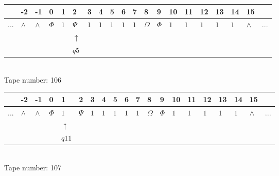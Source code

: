 \documentclass[11pt]{article}
\begin{document}
\begin{table}[H]
\centering
\begin{tabular}{llllllllllllllllllll}
 & -2 & -1 & 0 & 1 & 2 & 3 & 4 & 5 & 6 & 7 & 8 & 9 & 10 & 11 & 12 & 13 & 14 & 15 & \\
\hline
$...$ & \multicolumn{1}{|l|}{$\wedge$} & \multicolumn{1}{|l|}{$\wedge$} & \multicolumn{1}{|l|}{$\Phi$} & \multicolumn{1}{|l|}{$1$} & \multicolumn{1}{|l|}{$\Psi$} & \multicolumn{1}{|l|}{$1$} & \multicolumn{1}{|l|}{$1$} & \multicolumn{1}{|l|}{$1$} & \multicolumn{1}{|l|}{$1$} & \multicolumn{1}{|l|}{$1$} & \multicolumn{1}{|l|}{$\Omega$} & \multicolumn{1}{|l|}{$\Phi$} & \multicolumn{1}{|l|}{$1$} & \multicolumn{1}{|l|}{$1$} & \multicolumn{1}{|l|}{$1$} & \multicolumn{1}{|l|}{$1$} & \multicolumn{1}{|l|}{$1$} & \multicolumn{1}{|l|}{$\wedge$} & $...$\\
\hline
&  &  &  &  & $\uparrow$ &  &  &  &  &  &  &  &  &  &  &  &  &  &  \\
&  &  &  &  & $ q5 $ &  &  &  &  &  &  &  &  &  &  &  &  &  &  \\
\end{tabular}
\\
Tape number: 106
\noindent\makebox[\linewidth]{\hdashrule{\textwidth}{1pt}{1pt}}\end{table}

\begin{table}[H]
\centering
\begin{tabular}{llllllllllllllllllll}
 & -2 & -1 & 0 & 1 & 2 & 3 & 4 & 5 & 6 & 7 & 8 & 9 & 10 & 11 & 12 & 13 & 14 & 15 & \\
\hline
$...$ & \multicolumn{1}{|l|}{$\wedge$} & \multicolumn{1}{|l|}{$\wedge$} & \multicolumn{1}{|l|}{$\Phi$} & \multicolumn{1}{|l|}{$1$} & \multicolumn{1}{|l|}{$\Psi$} & \multicolumn{1}{|l|}{$1$} & \multicolumn{1}{|l|}{$1$} & \multicolumn{1}{|l|}{$1$} & \multicolumn{1}{|l|}{$1$} & \multicolumn{1}{|l|}{$1$} & \multicolumn{1}{|l|}{$\Omega$} & \multicolumn{1}{|l|}{$\Phi$} & \multicolumn{1}{|l|}{$1$} & \multicolumn{1}{|l|}{$1$} & \multicolumn{1}{|l|}{$1$} & \multicolumn{1}{|l|}{$1$} & \multicolumn{1}{|l|}{$1$} & \multicolumn{1}{|l|}{$\wedge$} & $...$\\
\hline
&  &  &  & $\uparrow$ &  &  &  &  &  &  &  &  &  &  &  &  &  &  &  \\
&  &  &  & $ q11 $ &  &  &  &  &  &  &  &  &  &  &  &  &  &  &  \\
\end{tabular}
\\
Tape number: 107
\noindent\makebox[\linewidth]{\hdashrule{\textwidth}{1pt}{1pt}}\end{table}
\clearpage
\end{document}
